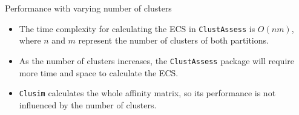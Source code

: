 \begin{frame}{Performance with varying number of clusters}
    \begin{itemize}
    \item The time complexity for calculating the ECS in \texttt{ClustAssess} is $O(nm)$, where $n$ and $m$ represent the number of clusters of both partitions.
        

    \item As the number of clusters increases, the \texttt{ClustAssess} package will require more time and space to calculate the ECS.

    \item \texttt{Clusim} calculates the whole affinity matrix, so its performance is not influenced by the number of clusters.

    \end{itemize}
\end{frame}

